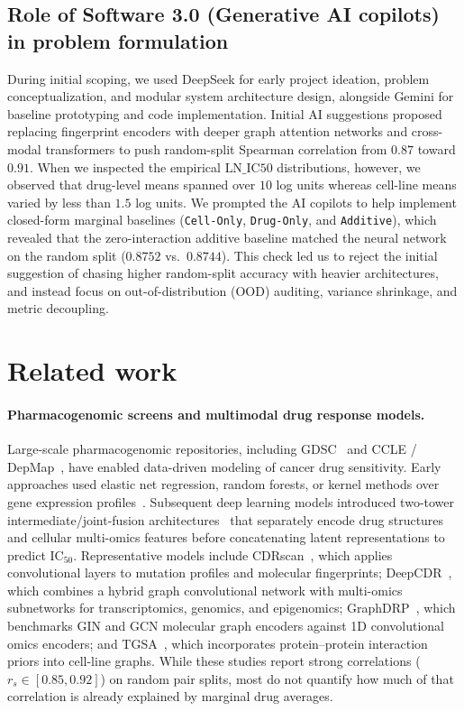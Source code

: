 \documentclass{article}
\begin{document}
\subsection{Role of Software 3.0 (Generative AI copilots) in problem formulation}
During initial scoping, we used DeepSeek for early project ideation, problem conceptualization, and modular system architecture design, alongside Gemini for baseline prototyping and code implementation. Initial AI suggestions proposed replacing fingerprint encoders with deeper graph attention networks and cross-modal transformers to push random-split Spearman correlation from $0.87$ toward $0.91$. When we inspected the empirical $\text{LN\_IC50}$ distributions, however, we observed that drug-level means spanned over $10$ log units whereas cell-line means varied by less than $1.5$ log units. We prompted the AI copilots to help implement closed-form marginal baselines (\texttt{Cell-Only}, \texttt{Drug-Only}, and \texttt{Additive}), which revealed that the zero-interaction additive baseline matched the neural network on the random split ($0.8752$ vs.\ $0.8744$). This check led us to reject the initial suggestion of chasing higher random-split accuracy with heavier architectures, and instead focus on out-of-distribution (OOD) auditing, variance shrinkage, and metric decoupling.

\section{Related work}
\label{sec:related}

\paragraph{Pharmacogenomic screens and multimodal drug response models.}
Large-scale pharmacogenomic repositories, including GDSC~\cite{yang2013gdsc,iorio2016landscape} and CCLE / DepMap~\cite{barretina2012ccle,tsherniak2017depmap,ghandi2019next}, have enabled data-driven modeling of cancer drug sensitivity. Early approaches used elastic net regression, random forests, or kernel methods over gene expression profiles~\cite{iorio2016landscape,costello2014community}. Subsequent deep learning models introduced two-tower intermediate/joint-fusion architectures~\cite{huang2020fusion} that separately encode drug structures and cellular multi-omics features before concatenating latent representations to predict $\text{IC}_{50}$. Representative models include CDRscan~\cite{chang2018cdrscan}, which applies convolutional layers to mutation profiles and molecular fingerprints; DeepCDR~\cite{liu2020deepcdr}, which combines a hybrid graph convolutional network with multi-omics subnetworks for transcriptomics, genomics, and epigenomics; GraphDRP~\cite{nguyen2021graphdrp}, which benchmarks GIN and GCN molecular graph encoders against 1D convolutional omics encoders; and TGSA~\cite{zhu2022tgsa}, which incorporates protein--protein interaction priors into cell-line graphs. While these studies report strong correlations ($r_s \in [0.85, 0.92]$) on random pair splits, most do not quantify how much of that correlation is already explained by marginal drug averages.
\end{document}
